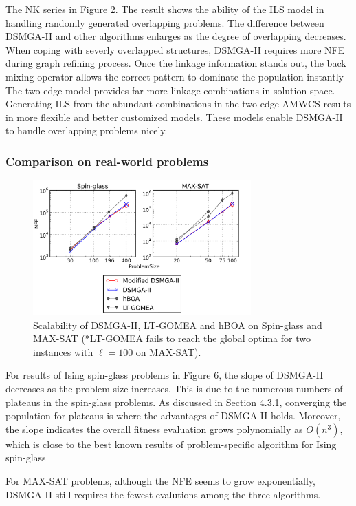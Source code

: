 \documentclass{sig-alternate-05-2015}
\begin{document}
The NK series in Figure 2.
The result shows the ability of the ILS model in handling randomly generated overlapping problems. 
The difference between DSMGA-II and other algorithms enlarges as the degree of overlapping decreases. 
When coping with severly overlapped structures, DSMGA-II requires more NFE during graph refining process.
Once the linkage information stands out, the back mixing operator allows the correct pattern to dominate the population instantly 
The two-edge model provides far more linkage combinations in solution space.
Generating ILS from the abundant combinations in the two-edge AMWCS results in more flexible and better customized models.
These models enable DSMGA-II to handle overlapping problems nicely. 


\subsubsection{ Comparison on real-world problems }

\begin{figure}
\centering
\includegraphics[width=3.3in]{spin_satResults}
\caption{Scalability of DSMGA-II, LT-GOMEA and hBOA on Spin-glass and MAX-SAT (*LT-GOMEA fails to reach the global optima for two instances with $\ell=100$ on MAX-SAT).}
\end{figure}

For results of Ising spin-glass problems in Figure 6, the slope of DSMGA-II decreases as the problem size increases. 
This is due to the numerous numbers of plateaus in the spin-glass problems.
As discussed in Section 4.3.1, converging the population for plateaus is where the advantages of DSMGA-II holds.
Moreover, the slope indicates the overall fitness evaluation grows polynomially as $O(n^3)$, which is close to the best known results of problem-specific algorithm for Ising spin-glass~\cite{galluccio:pfaffian}

For MAX-SAT problems, although the NFE seems to grow exponentially, DSMGA-II still requires the fewest evalutions among the three algorithms.
\end{document}
